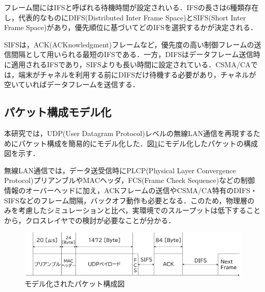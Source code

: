 \documentclass[a4paper, 10pt]{ltjsarticle}
\begin{document}
フレーム間にはIFSと呼ばれる待機時間が設定されいる．IFSの長さは6種類存在し，代表的なものにDIFS(Distributed Inter Frame Space)とSIFS(Short Inter Frame Space)があり，優先順位に基づいてどのIFSを選択するかが決定される．

SIFSは，ACK(ACKnowledgment)フレームなど，優先度の高い制御フレームの送信間隔として用いられる最短のIFSである．一方，DIFSはデータフレーム送信時に適用されるIFSであり，SIFSよりも長い時間に設定されている．CSMA/CAでは，端末がチャネルを利用する前にDIFSだけ待機する必要があり，チャネルが空いていればデータフレームを送信する．


\subsection{パケット構成モデル化}

本研究では，UDP(User Datagram Protocol)レベルの無線LAN通信を再現するためにパケット構成を簡易的にモデル化した．図\ref{packet}にモデル化したパケットの構成図を示す．


無線LAN通信では，データ送受信時にPLCP(Physical
Layer Convergence Protocol)プリアンブルやMACヘッダ，FCS(Frame Check Sequence)などの制御情報のオーバーヘッドに加え，ACKフレームの送信やCSMA/CA特有のDIFS・SIFSなどのフレーム間隔，バックオフ動作も必要となる．このため，物理層のみを考慮したシミュレーションと比べ，実環境でのスループットは低下することから，クロスレイヤでの検討が必要なことが分かる．

\begin{figure}[htbp]
  \centering
  \includegraphics[width=1\columnwidth]{./assets/packet.png}
  \caption{モデル化されたパケット構成図}
  \label{packet}
\end{figure}


\end{document}
